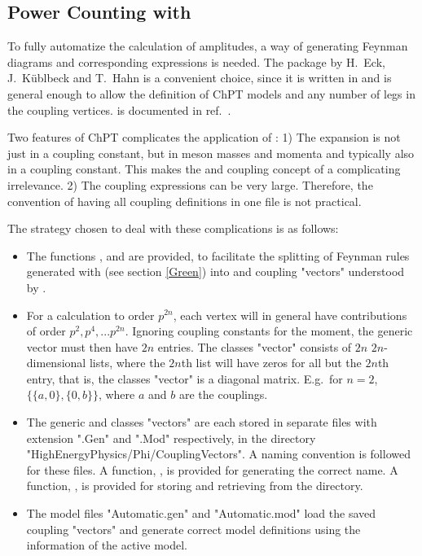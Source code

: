 \subsection{Power Counting with \fa}

To fully automatize the calculation of amplitudes, a way of generating Feynman diagrams and
corresponding expressions  is needed. The package \fa by H.~Eck, J.~K\"ublbeck and T.~Hahn
is a convenient choice, since it is written in \mma
and is general enough to allow the definition of ChPT models and any number of legs in the
coupling vertices. \fa is documented in ref.~.

Two features of ChPT complicates the application of \fa:
1) The expansion is not just in a coupling constant, but in meson masses and momenta and
typically also in a coupling constant.
This makes the  and  coupling concept of \fa a complicating irrelevance.
2) The coupling expressions can be very large. Therefore, the \fa convention of having all
coupling definitions in one file is not practical.

The strategy chosen to deal with these complications is as follows:
\begin{itemize}
\item The functions ,  and 
are provided, to facilitate the splitting of Feynman rules generated with
 (see section \ref{Green}) into  and  coupling "vectors"
understood by \fa.
\item For a calculation to order $p^{2 n}$, each vertex will in general have contributions of
order $p^2, p^4, ... p^{2 n}$. Ignoring coupling constants for the moment, the generic vector must
then have $2 n$ entries. The classes "vector" consists of $2 n$ $2 n$-dimensional lists,
where the $2 n$th list will have zeros for all but the $2 n$th entry, that is, the classes
"vector" is a diagonal matrix. E.g.~for $n=2$, $\{\{a,0\},\{0,b\}\}$, where $a$ and $b$ are the
couplings.
\item The generic and classes "vectors" are each stored in separate files with extension
".Gen" and ".Mod" respectively, in the directory "HighEnergyPhysics/Phi/CouplingVectors".
A naming convention is followed for these files.
A function, , is provided for generating the correct name.
A function, , is provided for storing and retrieving from the directory.
\item The \fa model files "Automatic.gen" and "Automatic.mod" load the saved coupling "vectors"
and generate correct \fa model definitions using the information of the active \fphi model.
\end{itemize}

